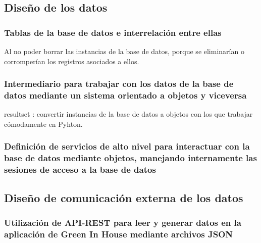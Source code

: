     
    \subsection{Diseño de los datos}
    
        \subsubsection{Tablas de la base de datos e interrelación entre ellas}

        
            Al no poder borrar las instancias de la base de datos, porque se eliminarían o corromperían los registros asociados a ellos.
        
        \subsubsection{Intermediario para trabajar con los datos de la base de datos mediante un sistema orientado a objetos y viceversa}
        resultset : convertir instancias de la base de datos a objetos con los que trabajar cómodamente en Pyhton.

        
        \subsubsection{Definición de servicios de alto nivel para interactuar con la base de datos mediante objetos, manejando internamente las sesiones de acceso a la base de datos}
        
    \subsection{Diseño de comunicación externa de los datos}

        \subsubsection{Utilización de API-REST para leer y generar datos en la aplicación de Green In House mediante archivos JSON}

